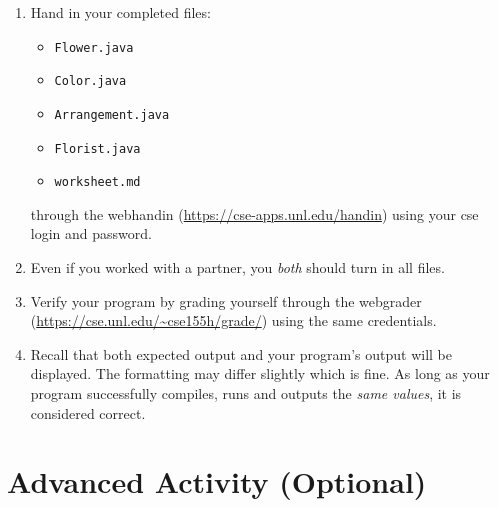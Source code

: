 \documentclass[12pt]{scrartcl}
\begin{document}
\begin{enumerate}
  \item Hand in your completed files:
    \begin{itemize}
    \item \texttt{Flower.java}
    \item \texttt{Color.java}
    \item \texttt{Arrangement.java}
    \item \texttt{Florist.java}
    \item \texttt{worksheet.md}
  \end{itemize}
  through the webhandin (\url{https://cse-apps.unl.edu/handin}) 
  using your cse login and password.  
  \item Even if you worked with a partner, you \emph{both} should
  turn in all files.
  \item Verify your program by grading yourself through the
  webgrader (\url{https://cse.unl.edu/~cse155h/grade/}) using the
  same credentials.
  \item Recall that both expected output and your program's output
  will be displayed.  The formatting may differ slightly which is fine.
  As long as your program successfully compiles, runs and outputs 
  the \emph{same values}, it is considered correct.
\end{enumerate}

	
\section{Advanced Activity (Optional)}
\end{document}
